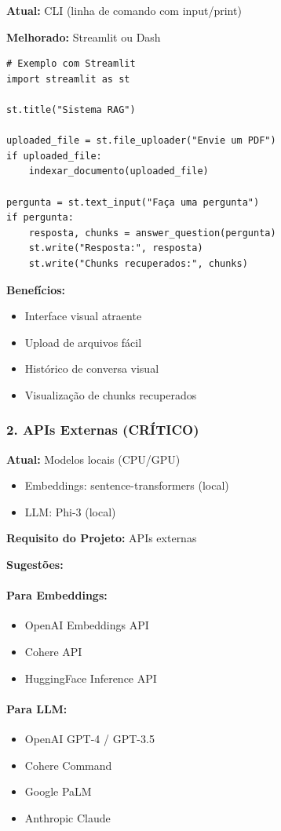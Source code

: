 \documentclass[12pt,a4paper]{article}
\begin{document}
\textbf{Atual:} CLI (linha de comando com input/print)

\textbf{Melhorado:} Streamlit ou Dash

\begin{lstlisting}
# Exemplo com Streamlit
import streamlit as st

st.title("Sistema RAG")

uploaded_file = st.file_uploader("Envie um PDF")
if uploaded_file:
    indexar_documento(uploaded_file)

pergunta = st.text_input("Faça uma pergunta")
if pergunta:
    resposta, chunks = answer_question(pergunta)
    st.write("Resposta:", resposta)
    st.write("Chunks recuperados:", chunks)
\end{lstlisting}

\textbf{Benefícios:}
\begin{itemize}
    \item Interface visual atraente
    \item Upload de arquivos fácil
    \item Histórico de conversa visual
    \item Visualização de chunks recuperados
\end{itemize}

\subsubsection{2. APIs Externas (CRÍTICO)}

\textbf{Atual:} Modelos locais (CPU/GPU)
\begin{itemize}
    \item Embeddings: sentence-transformers (local)
    \item LLM: Phi-3 (local)
\end{itemize}

\textbf{Requisito do Projeto:} APIs externas

\textbf{Sugestões:}

\paragraph{Para Embeddings:}
\begin{itemize}
    \item OpenAI Embeddings API
    \item Cohere API
    \item HuggingFace Inference API
\end{itemize}

\paragraph{Para LLM:}
\begin{itemize}
    \item OpenAI GPT-4 / GPT-3.5
    \item Cohere Command
    \item Google PaLM
    \item Anthropic Claude
\end{itemize}
\end{document}
